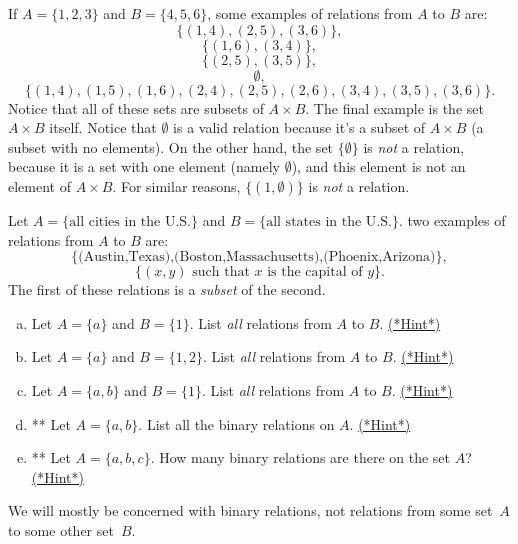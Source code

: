 \begin{eg}\label{ex_rel}
If $A = \{1,2,3\}$ and $B = \{4,5,6\}$, some examples of relations from $A$ to $B$ are:
\[ \{ (1,4), (2,5), (3,6)\}, \]
\[ \{ (1,6), (3,4)\}, \]
\[ \{ (2,5), (3,5) \}, \]
\[ \emptyset, \]
\[ \{ (1,4), (1,5), (1,6), (2,4), (2,5), (2,6), (3,4), (3,5), (3,6) \}.\] 
Notice that all of these sets are subsets of $A \times B$. The final example is the set $A \times B$ itself. Notice that $\emptyset$ is a valid relation because it's a subset of $A \times B$ (a subset with no elements).  On the other hand, the set $\{ \emptyset \}$ is \emph{not} a relation, because it is  a set with one element (namely $\emptyset$), and this element is not an element of $A \times B$. For similar reasons, $\{(1, \emptyset) \}$ is \emph{not} a relation.
\end{eg}

\begin{eg}
Let $A = \{\text{all cities in the U.S.}\}$ and $B = \{\text{all states in the U.S.}\}$. two examples of relations from $A$ to $B$ are:
\[ \{ \text{(Austin,Texas),(Boston,Massachusetts),(Phoenix,Arizona)}\}, \]
\[ \{ (x,y) \text{ such that } x \text{ is the capital of } y \}. \]
The first of these relations  is a \emph{subset} of the second.
\end{eg}


\begin{exercise}{7}
\begin{enumerate}[(a)]
\item
Let $A = \{a\}$ and $B = \{1\}$. List \emph{all} relations from $A$ to $B$.
\hyperref[secEqRelChapHints]{(*Hint*)}
\item
Let $A = \{a\}$ and $B = \{1,2\}$. List \emph{all} relations from $A$ to $B$.
\hyperref[secEqRelChapHints]{(*Hint*)}
\item
Let $A = \{a,b\}$ and $B = \{1\}$. List \emph{all} relations from $A$ to $B$.
\hyperref[secEqRelChapHints]{(*Hint*)}
\item
** Let $A = \{a,b\}$. List all the binary relations on $A$.
\hyperref[secEqRelChapHints]{(*Hint*)}
\item
** Let $A = \{a,b,c\}$. How many binary relations are there on the set $A$?
\hyperref[secEqRelChapHints]{(*Hint*)}
\end{enumerate}
\end{exercise}



We will mostly be concerned with binary relations, not relations from some set~$A$ to some other set~$B$.

